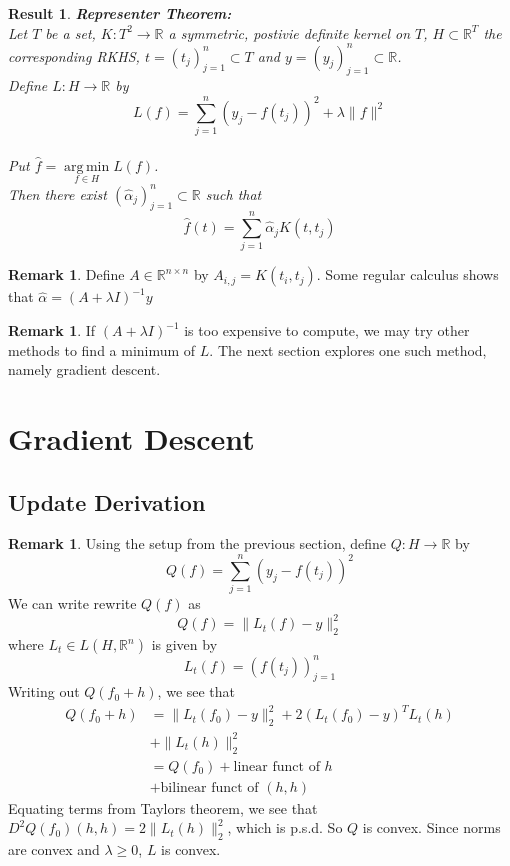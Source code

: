\documentclass[twoside]{article}
\newtheorem{res}[thm]{Result}
\theoremstyle{definition}
\theoremstyle{definition}
\newtheorem{rem}[definition]{Remark}
\newcommand{\al}{\alpha}
\newcommand{\lam}{\lambda}
\newcommand{\R}{\mathbb{R}}
\DeclareMathOperator*{\argmin}{arg\,min}
\begin{document}
\begin{res}\textbf{Representer Theorem:}\\
Let $T$ be a set, $K : T^2 \rightarrow \R$ a symmetric, postivie definite kernel on $T$, $H \subset \R^T$ the corresponding RKHS, $t = (t_j)_{j=1}^n \subset T$ and $y = (y_j)_{j=1}^n \subset \R$. \\
Define $L: H \rightarrow \R$ by $$L(f) = \sum_{j=1}^n (y_j - f(t_j) )^2 + \lam \|f\|^2$$ \\
Put $\hat{f} = \argmin\limits_{f \in H}L(f)$. \\
Then there exist $(\hat{\al}_j)_{j=1}^n \subset \R$ such that $$\hat{f}(t) = \sum_{j=1}^n \hat{\al}_jK(t, t_j)$$
\end{res}

\begin{rem}
Define $A \in \R^{n \times n}$ by $A_{i,j} = K(t_i, t_j)$. Some regular calculus shows that $\hat{\al} = (A + \lam I)^{-1}y$
\end{rem}

\begin{rem}
If $(A + \lam I)^{-1}$ is too expensive to compute, we may try other methods to find a minimum of $L$. The next section explores one such method, namely gradient descent.
\end{rem}

\section{Gradient Descent}
\subsection{Update Derivation}
\begin{rem}
Using the setup from the previous section, define $Q: H \rightarrow \R$ by $$Q(f) = \sum_{j=1}^n (y_j - f(t_j) )^2$$ 
We can write rewrite $Q(f)$ as  $$Q(f) = \|L_t(f) - y\|_2^2$$ where $L_t \in L(H, \R^n)$ is given by $$L_t(f) = (f(t_j))_{j=1}^n$$ 
Writing out $Q(f_0 + h)$, we see that 
\begin{align*}
Q(f_0 + h) 
&= \|L_t(f_0) - y\|_2^2  + 2(L_t(f_0) - y)^T L_t(h) \\
& + \|L_t(h)\|_2^2 \\
&= Q(f_0) + \text{linear funct of $h$} \\
&+  \text{bilinear funct of $(h,h)$}
\end{align*}
Equating terms from Taylors theorem, we see that $D^2Q(f_0)(h,h) = 2\|L_t(h)\|_2^2$, which is p.s.d. So $Q$ is convex. Since norms are convex and $\lam \geq 0$, $L$ is convex. 
\end{rem}
\end{document}
